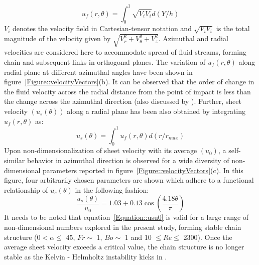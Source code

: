 \documentclass[%
 aip,
 sd,%
amsmath,amssymb,
preprint,%
author-year,%
]{revtex4-1}
\begin{document}
\begin{equation}\label{Equation::uf}
u_f(r,\theta) = \int_{0}^{1}\sqrt{V_iV_i}d(Y/h)
\end{equation}
{\color{red}$V_i$ denotes the velocity field in Cartesian-tensor notation and $\sqrt{V_iV_i}$ is the total magnitude of the velocity given by $\sqrt{V_r^2 + V_\theta^2 + V_z^2}$. Azimuthal and radial velocities are considered here to accommodate spread of fluid streams, forming chain and subsequent links in orthogonal planes.} The variation of $u_f(r,\theta)$ along radial plane at different azimuthal angles have been shown in figure~\ref{Figure::velocityVectors}(b). It can be observed that the order of change in the fluid velocity across the radial distance from the point of impact is less than the change across the azimuthal direction (also discussed by \cite{choo2002velocity}). Further, sheet velocity $\left(u_s(\theta)\right)$ along a radial plane has been also obtained by integrating $u_f(r,\theta)$ as:
\begin{equation}\label{Equation::us}
u_s(\theta) = \int_{0}^{1}u_f(r,\theta)d(r/r_{max})
\end{equation} 
Upon non-dimensionalization of sheet velocity with its average $\left(u_0\right)$, a self-similar behavior in azimuthal direction is observed for a wide diversity of non-dimensional parameters reported in figure~\ref{Figure::velocityVectors}(c). In this figure, four arbitrarily chosen parameters are shown which adhere to a functional relationship of $u_s(\theta)$ in the following fashion: 
\begin{equation}\label{Equation::usu0}
\frac{u_s(\theta)}{u_0} = 1.03 + 0.13\cos\left(\frac{4.18\theta}{\pi}\right)
\end{equation}
{\color{red}It needs to be noted that equation~\ref{Equation::usu0} is valid for a large range of non-dimensional numbers explored in the present study, forming stable chain structure (0\degree $< \alpha \le$  45\degree, $Fr \sim$ 1, $Bo \sim$ 1 and 10 $\le Re \le$ 2300).} Once the average sheet velocity exceeds a critical value, the chain structure is no longer stable as the  Kelvin - Helmholtz instability kicks in \citep{villermaux2002life}. \\
\end{document}
